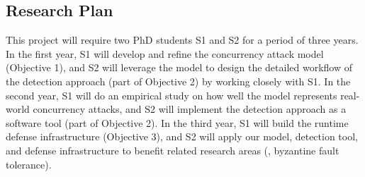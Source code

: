 \vspace{-.15in}\subsection{Research Plan} \label{sec:plan}\vspace{-.075in}

This \xxx project will require two PhD students S1 and S2 for a period of 
three years. In the first year, S1 will develop and refine the concurrency 
attack model (Objective 1), and S2 will leverage the model to design the 
detailed workflow of the detection approach (part of Objective 2) by working 
closely with S1. In the second year, S1 will do an empirical study on how well 
the model represents real-world concurrency attacks, and S2 will implement 
the detection approach as a software tool (part of Objective 2). In the third 
year, S1 will build the runtime defense infrastructure (Objective 3), and S2 
will apply our model, detection tool, and defense infrastructure to benefit 
related research areas (\eg, byzantine fault tolerance).


